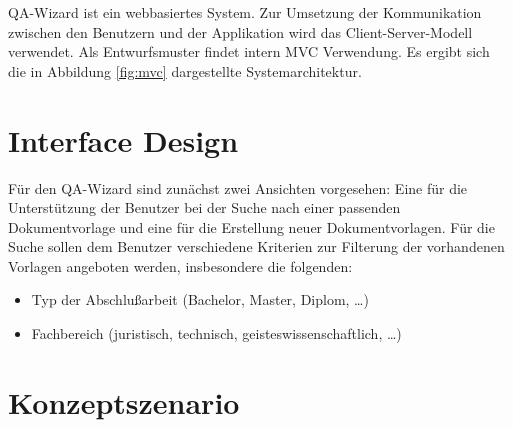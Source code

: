 \documentclass[12pt,        %
  english,ngerman,          %
  paper=a4,                 %
  captions=tablesignature,  %
  listof=numbered,          %
  bibliography=totoc,       %
  headings=small,           %
  headinclude=false,        %
  footinclude=false,        %
  parskip=half-,            %
  oneside,                  %
  BCOR=5mm,                 %
  DIV=12                    %
  ]{scrbook}                %
\begin{document}
QA-Wizard ist ein webbasiertes System. Zur Umsetzung der Kommunikation zwischen den Benutzern und der Applikation wird das Client-Server-Modell verwendet. Als Entwurfsmuster findet intern MVC Verwendung. Es ergibt sich die in Abbildung \ref{fig:mvc} dargestellte Systemarchitektur.


\section{Interface Design}\label{sec:concept_interface}


Für den QA-Wizard sind zunächst zwei Ansichten vorgesehen: Eine für die Unterstützung der Benutzer bei der Suche nach einer passenden Dokumentvorlage und eine für die Erstellung neuer Dokumentvorlagen. Für die Suche sollen dem Benutzer verschiedene Kriterien zur Filterung der vorhandenen Vorlagen angeboten werden, insbesondere die folgenden:

\begin{itemize}
  \item Typ der Abschlußarbeit (Bachelor, Master, Diplom, \ldots)
  \item Fachbereich (juristisch, technisch, geisteswissenschaftlich, \ldots)
\end{itemize}

\section{Konzeptszenario}\label{sec:design_sce}



\end{document}
